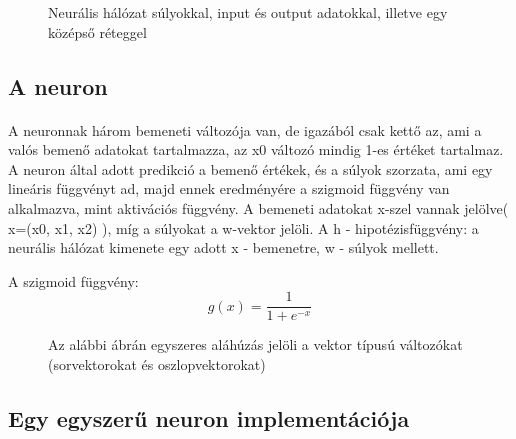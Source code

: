 \begin{figure}[t]
  \centering
  \caption[Egyszerű neurális háló]%
  {Neurális hálózat súlyokkal, input és output adatokkal, illetve egy középső réteggel}
  \label{fig:ALAP:sm1}
\end{figure}

\subsection{A neuron}
\paragraph{}
A neuronnak három bemeneti változója van, de igazából csak kettő az, ami a valós bemenő adatokat tartalmazza, az x0 változó mindig 1-es értéket tartalmaz. A neuron által adott predikció a bemenő értékek, és a súlyok szorzata, ami egy lineáris függvényt ad, majd ennek eredményére a szigmoid függvény van alkalmazva, mint aktivációs függvény.
A bemeneti adatokat x-szel vannak jelölve( x=(x0, x1, x2) ),  míg a súlyokat a w-vektor jelöli. A h - hipotézisfüggvény: a neurális hálózat kimenete egy adott x - bemenetre, w - súlyok mellett.

A szigmoid függvény:
\[
    g(x) = \frac{1}{1 + e^{-x}}
\]

\begin{figure}[t]
  \centering
  \caption[A neuron]%
  {Az alábbi ábrán egyszeres aláhúzás jelöli a vektor típusú változókat (sorvektorokat és oszlopvektorokat)}
  \label{fig:ALAP:sm1}
\end{figure}

\subsection{Egy egyszerű neuron implementációja}

